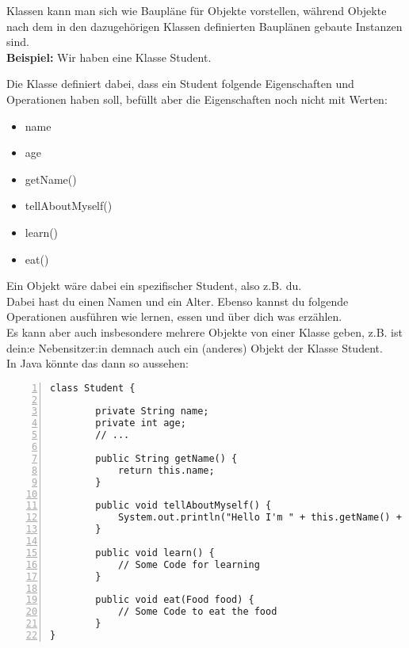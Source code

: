 
\begin{Infobox}
    Klassen kann man sich wie Baupläne für Objekte vorstellen, 
    während Objekte nach dem in den dazugehörigen Klassen definierten Bauplänen gebaute Instanzen sind.\\

    \textbf{Beispiel:} Wir haben eine Klasse Student.

    Die Klasse definiert dabei, dass ein Student folgende Eigenschaften und Operationen haben soll,  befüllt aber die Eigenschaften noch nicht mit Werten:

    \begin{itemize}
        \item name
        \item age
        \item getName()
        \item tellAboutMyself()
        \item learn()
        \item eat()
    \end{itemize}

    Ein Objekt wäre dabei ein spezifischer Student, also z.B. du.\\
Dabei hast du einen Namen und ein Alter.
Ebenso kannst du folgende Operationen ausführen wie lernen, essen und über dich was erzählen.\\
Es kann aber auch insbesondere mehrere Objekte von einer Klasse geben, z.B. ist dein:e Nebensitzer:in  demnach auch ein (anderes) Objekt der Klasse Student.\\

In Java könnte das dann so aussehen:
    \begin{lstlisting}[numbers=left,xleftmargin=2em,frame=single,framexleftmargin=1.5em]
class Student {

        private String name;
        private int age;
        // ...

        public String getName() {
            return this.name;
        }

        public void tellAboutMyself() {
            System.out.println("Hello I'm " + this.getName() + ". I'm " + age + " old!";
        }

        public void learn() {
            // Some Code for learning
        }

        public void eat(Food food) {
            // Some Code to eat the food
        }
}

    \end{lstlisting}
\end{Infobox}

